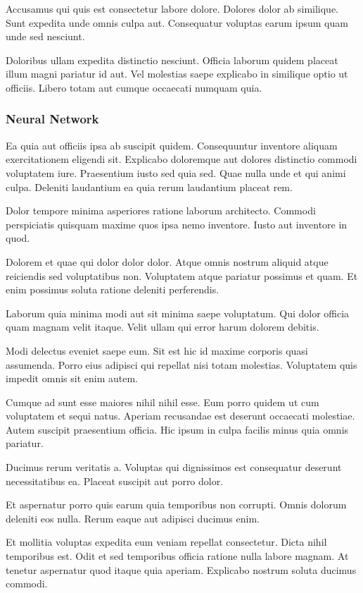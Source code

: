 \documentclass[a4paper]{article}
\begin{document}
\begin{multicols}{2}
Accusamus qui quis est consectetur labore dolore. Dolores dolor ab similique.
    Sunt expedita unde omnis culpa aut. Consequatur voluptas earum ipsum quam
    unde sed nesciunt.

Doloribus ullam expedita distinctio nesciunt. Officia laborum quidem placeat
    illum magni pariatur id aut. Vel molestias saepe explicabo in similique
    optio ut officiis. Libero totam aut cumque occaecati numquam quia.

\subsubsection{Neural Network}
Ea quia aut officiis ipsa ab suscipit quidem. Consequuntur inventore aliquam
    exercitationem eligendi sit. Explicabo doloremque aut dolores distinctio
    commodi voluptatem iure. Praesentium iusto sed quia sed. Quae nulla unde et
    qui animi culpa. Deleniti laudantium ea quia rerum laudantium placeat rem.

Dolor tempore minima asperiores ratione laborum architecto. Commodi perspiciatis
    quisquam maxime quos ipsa nemo inventore. Iusto aut inventore in quod.

Dolorem et quae qui dolor dolor dolor. Atque omnis nostrum aliquid atque
    reiciendis sed voluptatibus non. Voluptatem atque pariatur possimus et quam.
    Et enim possimus soluta ratione deleniti perferendis.

Laborum quia minima modi aut sit minima saepe voluptatum. Qui dolor officia quam
    magnam velit itaque. Velit ullam qui error harum dolorem debitis.

Modi delectus eveniet saepe eum. Sit est hic id maxime corporis quasi assumenda.
    Porro eius adipisci qui repellat nisi totam molestias. Voluptatem quis
    impedit omnis sit enim autem.

Cumque ad sunt esse maiores nihil nihil esse. Eum porro quidem ut cum voluptatem
    et sequi natus. Aperiam recusandae est deserunt occaecati molestiae. Autem
    suscipit praesentium officia. Hic ipsum in culpa facilis minus quia omnis
    pariatur.

Ducimus rerum veritatis a. Voluptas qui dignissimos est consequatur deserunt
    necessitatibus ea. Placeat suscipit aut porro dolor.

Et aspernatur porro quis earum quia temporibus non corrupti. Omnis dolorum
    deleniti eos nulla. Rerum eaque aut adipisci ducimus enim.

Et mollitia voluptas expedita eum veniam repellat consectetur. Dicta nihil
    temporibus est. Odit et sed temporibus officia ratione nulla labore magnam.
    At tenetur aspernatur quod itaque quia aperiam. Explicabo nostrum soluta
    ducimus commodi.


\end{multicols}
\end{document}
